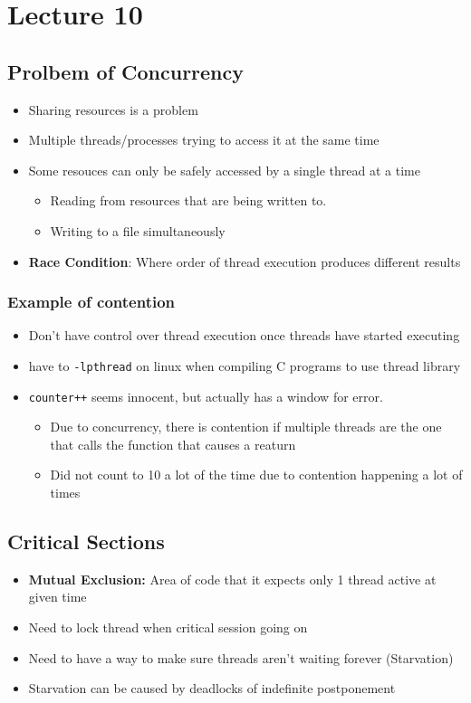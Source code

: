 \documentclass{article}
\begin{document}
\section{Lecture 10}
	\subsection{Prolbem of Concurrency}
	\begin{itemize}
		\item Sharing resources is a problem
		\item Multiple threads/processes trying to access it at the same time
		\item Some resouces can only be safely accessed by a single thread at a time
		\begin{itemize}
			\item Reading from resources that are being written to.
			\item Writing to a file simultaneously
		\end{itemize}
		\item \textbf{Race Condition}: Where order of thread execution produces different results
	\end{itemize}

		\subsubsection{Example of contention}
		\begin{itemize}
			\item Don't have control over thread execution once threads have started executing
			\item have to \texttt{-lpthread} on linux when compiling C programs to use thread library
			\item \texttt{counter++} seems innocent, but actually has a window for error.
			\begin{itemize}
				\item Due to concurrency, there is contention if multiple threads are the one that calls the function that causes a reaturn
				\item Did not count to 10 a lot of the time due to contention happening a lot of times
			\end{itemize}
		\end{itemize}

	\subsection{Critical Sections}
		\begin{itemize}
			\item \textbf{Mutual Exclusion:} Area of code that it expects only 1 thread active at given time
			\item Need to lock thread when critical session going on
			\item Need to have a way to make sure threads aren't waiting forever (Starvation)
			\item Starvation can be caused by deadlocks of indefinite postponement
		\end{itemize}
		
\end{document}
